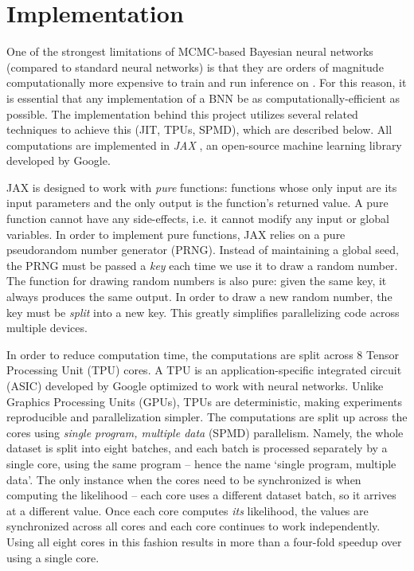 \documentclass[12pt]{article}
\begin{document}
{\begin{algorithm}
\begin{algorithmic}
	\EndFor
\EndFor
\end{algorithmic}
\end{algorithm}
\restoregeometry
\newpage

\section{Implementation}

One of the strongest limitations of MCMC-based Bayesian neural networks (compared to standard neural networks) is that they are orders of magnitude computationally more expensive to train and run inference on \cite{bnn_posterior}. For this reason, it is essential that any implementation of a BNN be as computationally-efficient as possible. The implementation behind this project utilizes several related techniques to achieve this (JIT, TPUs, SPMD), which are described below. All computations are implemented in \textit{JAX} \cite{jax}, an open-source machine learning library developed by Google.

JAX is designed to work with \textit{pure} functions: functions whose only input are its input parameters and the only output is the function's returned value. A pure function cannot have any side-effects, i.e. it cannot modify any input or global variables. In order to implement pure functions, JAX relies on a pure pseudorandom number generator (PRNG). Instead of maintaining a global seed, the PRNG must be passed a \textit{key} each time we use it to draw a random number. The function for drawing random numbers is also pure: given the same key, it always produces the same output. In order to draw a new random number, the key must be \textit{split} into a new key. This greatly simplifies parallelizing code across multiple devices.  

In order to reduce computation time, the computations are split across 8 Tensor Processing Unit (TPU) cores. A TPU is an application-specific integrated circuit (ASIC) developed by Google optimized to work with neural networks. Unlike Graphics Processing Units (GPUs), TPUs are deterministic, making experiments reproducible and parallelization simpler. The computations are split up across the cores using \textit{single program, multiple data} (SPMD) parallelism. Namely, the whole dataset is split into eight batches, and each batch is processed separately by a single core, using the same program -- hence the name `single program, multiple data'. The only instance when the cores need to be synchronized is when computing the likelihood -- each core uses a different dataset batch, so it arrives at a different value. Once each core computes \textit{its} likelihood, the values are synchronized across all cores and each core continues to work independently. Using all eight cores in this fashion results in more than a four-fold speedup over using a single core. 

}
\end{document}
